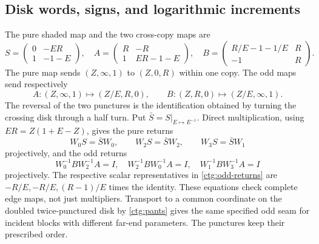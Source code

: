 \documentclass[11pt]{article}
\numberwithin{equation}{section}
\theoremstyle{definition}
\theoremstyle{remark}
\begin{document}
\subsection{Disk words, signs, and logarithmic increments}
\label{ctg:words}
The pure shaded map and the two cross-copy maps are
\begin{equation}\label{ctg:shaded}
 S=\begin{pmatrix}0&-ER\\1&-1-E\end{pmatrix},\quad
 A=\begin{pmatrix}R&-R\\1&ER-1-E\end{pmatrix},\quad
 B=\begin{pmatrix}R/E-1-1/E&R\\-1&R\end{pmatrix}.
\end{equation}
The pure map sends $(Z,\infty,1)$ to $(Z,0,R)$ within one copy.
The odd maps send respectively
\[
 A:(Z,\infty,1)\mapsto(Z/E,R,0),\qquad
 B:(Z,R,0)\mapsto(Z/E,\infty,1).
\]
The reversal of the two punctures is the identification obtained
by turning the crossing disk through a half turn. Put $\bar S=S|_{E\mapsto E^{-1}}$. Direct
multiplication, using $ER=Z(1+E-Z)$, gives the pure returns
\begin{equation}\label{ctg:pure-returns}
 W_0S=\bar S W_0,\qquad W_2S=\bar S W_2,
 \qquad W_3S=\bar S W_1
\end{equation}
projectively, and the odd returns
\begin{equation}\label{ctg:odd-returns}
 W_0^{-1}BW_2^{-1}A=I,\quad
 W_2^{-1}BW_0^{-1}A=I,\quad
 W_1^{-1}BW_3^{-1}A=I
\end{equation}
projectively. The respective scalar representatives in
\eqref{ctg:odd-returns} are $-R/E,-R/E,(R-1)/E$ times the identity.
These equations check complete edge maps, not just multipliers.
Transport to a common coordinate on the doubled twice-punctured disk by \eqref{ctg:pants}
gives the same specified odd seam for incident blocks with different
far-end parameters. The punctures keep their prescribed order.
\end{document}

